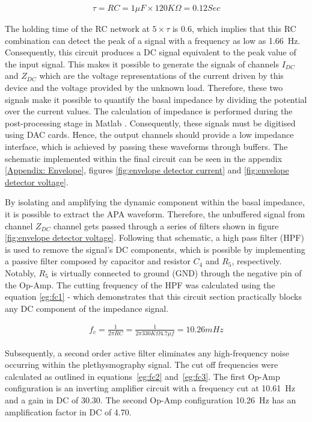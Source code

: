 \begin{align}
	\tau = RC = 1 \mu F \times 120K\Omega = 0.12 Sec
\end{align}

The holding time of the RC network at $5\times\tau$ is \SI{0.6}{\sec}, which implies that this RC combination can detect the peak of a signal with a frequency as low as \SI{1.66}{\Hz}. Consequently, this circuit produces a DC signal equivalent to the peak value of the input signal. This makes it possible to generate the signals of channels $I_{DC}$ and $Z_{DC}$ which are the voltage representations of the current driven by this device and the voltage provided by the unknown load. Therefore, these two signals make it possible to quantify the basal impedance by dividing the potential over the current values. The calculation of impedance is performed during the post-processing stage in Matlab \cite{MATLAB:2016}. Consequently, these signals must be digitised using DAC cards. Hence, the output channels should provide a low impedance interface, which is achieved by passing these waveforms through buffers. The schematic implemented within the final circuit can be seen in the appendix \ref{Appendix: Envelope}, figures \ref{fig:envelope detector current} and \ref{fig:envelope detector voltage}.

By isolating and amplifying the dynamic component within the basal impedance, it is possible to extract the APA waveform. Therefore, the unbuffered signal from channel $Z_{DC}$ channel gets passed through a series of filters shown in figure \ref{fig:envelope detector voltage}. Following that schematic, a high pass filter (HPF) is used to remove the signal's DC components, which is possible by implementing a passive filter composed by capacitor and resistor $C_4$ and $R_5$, respectively. Notably, $R_5$ is virtually connected to ground (GND) through the negative pin of the Op-Amp. The cutting frequency of the HPF was calculated using the equation \ref{eg:fc1} - which demonstrates that this circuit section practically blocks any DC component of the impedance signal. 

\begin{align}
	\label{eg:fc1}
	f_c = \frac{1}{2 \pi R C} = \frac{1}{2 \pi 330K\Omega 4.7\mu f}=10.26 mHz
\end{align}

Subsequently, a second order active filter eliminates any high-frequency noise occurring within the plethysmography signal. The cut off frequencies were calculated as outlined in equations~\ref{eg:fc2} and~\ref{eg:fc3}. The first Op-Amp configuration is an inverting amplifier circuit with a frequency cut at \SI{10.61}{\Hz} and a gain in DC of \num{30.30}. The second Op-Amp configuration \SI{10.26}{\Hz} has an amplification factor in DC of \num{4.70}. 

